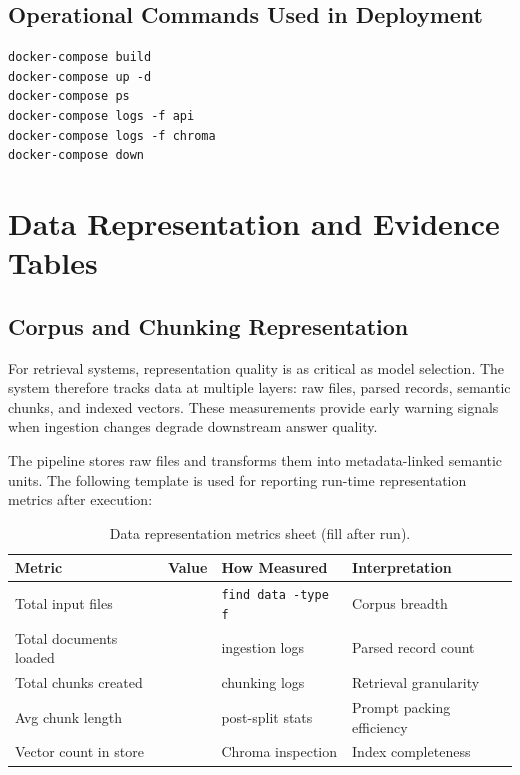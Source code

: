 \documentclass[12pt,letterpaper]{report}
\begin{document}
\subsection{Operational Commands Used in Deployment}
\begin{verbatim}
docker-compose build
docker-compose up -d
docker-compose ps
docker-compose logs -f api
docker-compose logs -f chroma
docker-compose down
\end{verbatim}

\section{Data Representation and Evidence Tables}
\subsection{Corpus and Chunking Representation}
For retrieval systems, representation quality is as critical as model selection. The system therefore tracks data at multiple layers: raw files, parsed records, semantic chunks, and indexed vectors. These measurements provide early warning signals when ingestion changes degrade downstream answer quality.

The pipeline stores raw files and transforms them into metadata-linked semantic units. The following template is used for reporting run-time representation metrics after execution:
\begin{table}[h]
\centering
\begin{tabular}{p{}p{}p{}p{}}
\hline
\textbf{Metric} & \textbf{Value} & \textbf{How Measured} & \textbf{Interpretation} \\
\hline
Total input files & \underline{\hspace{2cm}} & \texttt{find data -type f} & Corpus breadth \\
Total documents loaded & \underline{\hspace{2cm}} & ingestion logs & Parsed record count \\
Total chunks created & \underline{\hspace{2cm}} & chunking logs & Retrieval granularity \\
Avg chunk length & \underline{\hspace{2cm}} & post-split stats & Prompt packing efficiency \\
Vector count in store & \underline{\hspace{2cm}} & Chroma inspection & Index completeness \\
\hline
\end{tabular}
\caption{Data representation metrics sheet (fill after run).}
\end{table}
\end{document}
